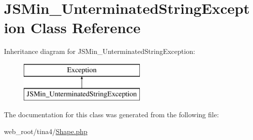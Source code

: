 \hypertarget{classJSMin__UnterminatedStringException}{}\section{J\+S\+Min\+\_\+\+Unterminated\+String\+Exception Class Reference}
\label{classJSMin__UnterminatedStringException}
Inheritance diagram for J\+S\+Min\+\_\+\+Unterminated\+String\+Exception\+:\begin{figure}[H]
\begin{center}
\leavevmode
\includegraphics[height=2.000000cm]{classJSMin__UnterminatedStringException}
\end{center}
\end{figure}


The documentation for this class was generated from the following file\+:\begin{DoxyCompactItemize}
\item 
web\+\_\+root/tina4/\hyperlink{Shape_8php}{Shape.\+php}\end{DoxyCompactItemize}
